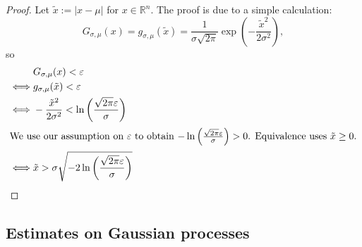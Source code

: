 \documentclass{article}
\theoremstyle{plain}
\theoremstyle{remark}
\theoremstyle{definition}
\begin{document}
 \begin{proof} Let $\tilde{x} := |x - \mu|$ for $x \in \mathbb{R}^n$. The proof is due to a simple calculation:
 \begin{equation*}
 G_{\sigma, \mu} (x) = g_{\sigma, \mu} (\tilde{x}) = \frac{1}{\sigma \sqrt{2 \pi}} \exp \left( - \frac{\tilde{x}^2}{2 \sigma^2} \right),
 \end{equation*}
 so
 \begin{align*}
& G_{\sigma, \mu} (x) < \varepsilon \\
\iff & g_{\sigma, \mu} ( \tilde{x} ) < \varepsilon \\
\iff & - \frac{\tilde{x}^2}{2 \sigma^2} < \ln \left(  \frac{\sqrt{2 \pi} \varepsilon}{\sigma} \right) \\
\intertext{We use our assumption on $\varepsilon$ to obtain $- \ln \left( \frac{ \sqrt{2 \pi} \varepsilon}{\sigma} \right) > 0$. Equivalence uses $\tilde{x} \geq 0$.}
\iff & \tilde{x} > \sigma \sqrt{ - 2 \ln \left( \frac{\sqrt{2 \pi} \varepsilon}{\sigma} \right)}
 \end{align*}
 \end{proof}
 \subsection{Estimates on Gaussian processes}
 
\end{document}
